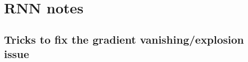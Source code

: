 \documentclass[11pt]{article}
\begin{document}
\begin{figure}[H]
    \centering
\end{figure}

\clearpage

\appendix

\section{RNN notes}

\subsection{Tricks to fix the gradient vanishing/explosion issue}\label{app:tricks-gradient-v/e}
\end{document}
